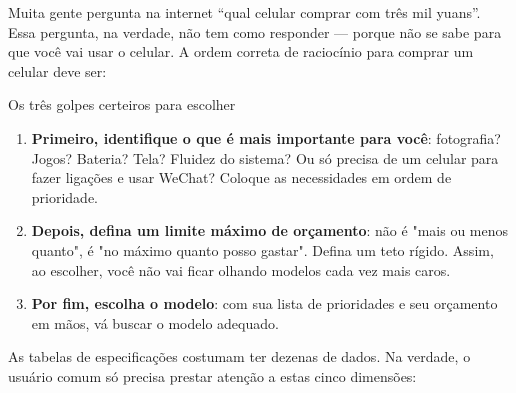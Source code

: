 


Muita gente pergunta na internet “qual celular comprar com três mil yuans”. Essa pergunta, na verdade, não tem como responder — porque não se sabe para que você vai usar o celular. A ordem correta de raciocínio para comprar um celular deve ser:

\begin{tcbinfo}{Os três golpes certeiros para escolher}
\begin{enumerate}
  \item \textbf{Primeiro, identifique o que é mais importante para você}: fotografia? Jogos? Bateria? Tela? Fluidez do sistema? Ou só precisa de um celular para fazer ligações e usar WeChat? Coloque as necessidades em ordem de prioridade.
  \item \textbf{Depois, defina um limite máximo de orçamento}: não é "mais ou menos quanto", é "no máximo quanto posso gastar". Defina um teto rígido. Assim, ao escolher, você não vai ficar olhando modelos cada vez mais caros.
  \item \textbf{Por fim, escolha o modelo}: com sua lista de prioridades e seu orçamento em mãos, vá buscar o modelo adequado.
\end{enumerate}

\end{tcbinfo}


As tabelas de especificações costumam ter dezenas de dados. Na verdade, o usuário comum só precisa prestar atenção a estas cinco dimensões:

